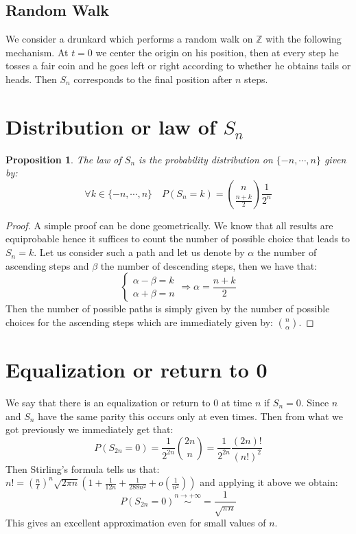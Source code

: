 \documentclass[10pt,a4paper]{book}
\newtheorem{proposition}[section]{Proposition}
\theoremstyle{definition}
\begin{document}
\subsection{Random Walk} We consider a drunkard which performs a random walk on $\mathbb{Z}$ with the following mechanism. At $t=0$ we center the origin on his position, then at every step he tosses a fair coin and he goes left or right according to whether he obtains tails or heads. Then $S_n$ corresponds to the final position after $n$ steps.
\begin{figure}
\centering
{}
\end{figure}

\section{Distribution or law of $S_n$}
\begin{proposition}
The law of $S_n$ is the probability distribution on $\{-n, \cdots, n\}$ given by:
\[
\forall k \in \{-n, \cdots, n\} \quad P(S_n = k) = \binom{n}{\frac{n + k}{2}} \frac{1}{2^n}
\]
\end{proposition}
\begin{proof}
A simple proof can be done geometrically. We know that all results are equiprobable hence it suffices to count the number of possible choice that leads to $S_n = k$. Let us consider such a path and let us denote by $\alpha$ the number of ascending steps and $\beta$ the number of descending steps, then we have that:
\[
\begin{cases}
\alpha - \beta = k\\
\alpha + \beta = n
\end{cases}
\Rightarrow \alpha = \frac{n + k}{2}
\] 
Then the number of possible paths is simply given by the number of possible choices for the ascending steps which are immediately given by: $\binom{n}{\alpha}$.
\end{proof}

\section{Equalization or return to 0} We say that there is an equalization or return to 0 at time $n$ if $S_n = 0$. Since $n$ and $S_n$ have the same parity this occurs only at even times. Then from what we got previously we immediately get that:
\[
P(S_{2n} = 0) = \frac{1}{2^{2n}} \binom{2n}{n} = \frac{1}{2^{2n}} \frac{(2n)!}{(n!)^2}
\]
Then Stirling's formula tells us that: $n! = \left(\frac{n}{\ell}\right)^n \sqrt{2\pi n} \left( 1 + \frac{1}{12 n} + \frac{1}{288 n^2} + o(\frac{1}{n^2})\right)$ and applying it above we obtain:
\[
P(S_{2n} = 0) \stackrel{n \to +\infty}{\sim} = \frac{1}{\sqrt{\pi n}}
\]
This gives an excellent approximation even for small values of $n$.
\end{document}
